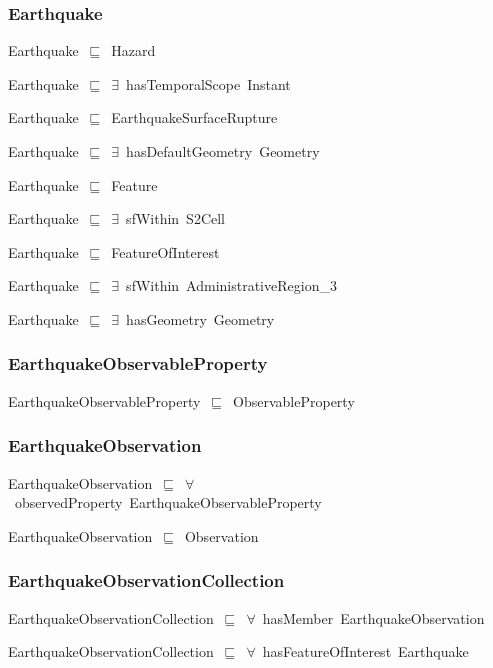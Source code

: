 \documentclass{article}
\begin{document}
\subsubsection*{Earthquake}

Earthquake~\ensuremath{\sqsubseteq}~Hazard~

Earthquake~\ensuremath{\sqsubseteq}~\ensuremath{\exists}~hasTemporalScope~Instant~

Earthquake~\ensuremath{\sqsubseteq}~EarthquakeSurfaceRupture~

Earthquake~\ensuremath{\sqsubseteq}~\ensuremath{\exists}~hasDefaultGeometry~Geometry~

Earthquake~\ensuremath{\sqsubseteq}~Feature~

Earthquake~\ensuremath{\sqsubseteq}~\ensuremath{\exists}~sfWithin~S2Cell~

Earthquake~\ensuremath{\sqsubseteq}~FeatureOfInterest~

Earthquake~\ensuremath{\sqsubseteq}~\ensuremath{\exists}~sfWithin~AdministrativeRegion\_3~

Earthquake~\ensuremath{\sqsubseteq}~\ensuremath{\exists}~hasGeometry~Geometry~

\subsubsection*{EarthquakeObservableProperty}

EarthquakeObservableProperty~\ensuremath{\sqsubseteq}~ObservableProperty~

\subsubsection*{EarthquakeObservation}

EarthquakeObservation~\ensuremath{\sqsubseteq}~\ensuremath{\forall}~observedProperty~EarthquakeObservableProperty~

EarthquakeObservation~\ensuremath{\sqsubseteq}~Observation~

\subsubsection*{EarthquakeObservationCollection}

EarthquakeObservationCollection~\ensuremath{\sqsubseteq}~\ensuremath{\forall}~hasMember~EarthquakeObservation~

EarthquakeObservationCollection~\ensuremath{\sqsubseteq}~\ensuremath{\forall}~hasFeatureOfInterest~Earthquake~
\end{document}
